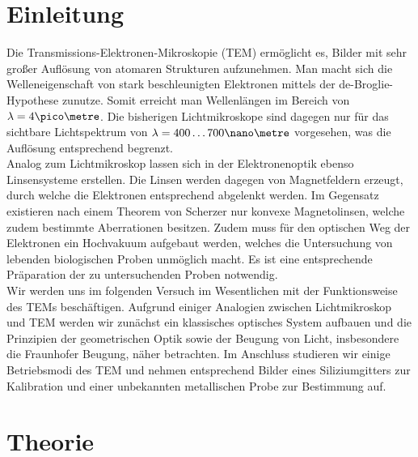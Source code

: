 
\section{Einleitung}
Die Transmissions-Elektronen-Mikroskopie (TEM) ermöglicht es, Bilder mit sehr großer Auflösung von atomaren Strukturen aufzunehmen. Man macht sich die Welleneigenschaft von stark beschleunigten Elektronen mittels der de-Broglie-Hypothese zunutze. Somit erreicht man Wellenlängen im Bereich von $\lambda=4\pico\metre$.
Die bisherigen Lichtmikroskope sind dagegen nur für das sichtbare Lichtspektrum von $\lambda=400\dots 700\nano\metre$ vorgesehen, was die Auflösung entsprechend begrenzt.\\
Analog zum Lichtmikroskop lassen sich in der Elektronenoptik ebenso Linsensysteme erstellen. Die Linsen werden dagegen von Magnetfeldern erzeugt, durch welche die Elektronen entsprechend abgelenkt werden. Im Gegensatz existieren nach einem Theorem von Scherzer nur konvexe Magnetolinsen, welche zudem bestimmte Aberrationen besitzen. Zudem muss für den optischen Weg der Elektronen ein Hochvakuum aufgebaut werden, welches die Untersuchung von lebenden biologischen Proben unmöglich macht. Es ist eine entsprechende Präparation der zu untersuchenden Proben notwendig.\\
Wir werden uns im folgenden Versuch im Wesentlichen mit der Funktionsweise des TEMs beschäftigen. Aufgrund einiger Analogien zwischen Lichtmikroskop und TEM werden wir zunächst ein klassisches optisches System aufbauen und die Prinzipien der geometrischen Optik sowie der Beugung von Licht, insbesondere die Fraunhofer Beugung, näher betrachten.
Im Anschluss studieren wir einige Betriebsmodi des TEM und nehmen entsprechend Bilder eines Siliziumgitters zur Kalibration und einer unbekannten metallischen Probe zur Bestimmung auf.
\section{Theorie}
